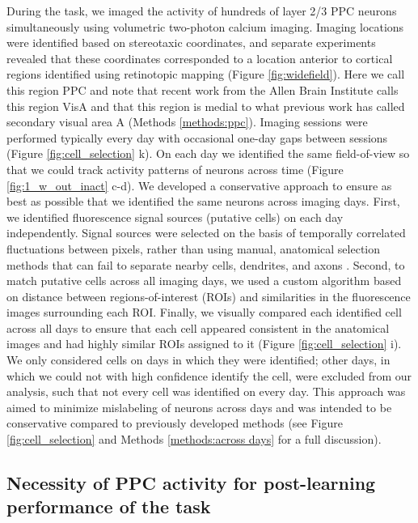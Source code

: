 During the task, we imaged the activity of hundreds of layer 2/3 PPC neurons simultaneously using volumetric two-photon calcium imaging. Imaging locations were identified based on stereotaxic coordinates, and separate experiments revealed that these coordinates corresponded to a location anterior to cortical regions identified using retinotopic mapping (Figure \ref{fig:widefield}). Here we call this region PPC and note that recent work from the Allen Brain Institute calls this region VisA  \citep{CCF2015} and that this region is medial to what previous work has called secondary visual area A \citep{Wang2007} (Methods \ref{methods:ppc}). Imaging sessions were performed typically every day with occasional one-day gaps between sessions (Figure \ref{fig:cell_selection} k). On each day we identified the same field-of-view so that we could track activity patterns of neurons across time (Figure \ref{fig:1_w_out_inact} c-d). We developed a conservative approach to ensure as best as possible that we identified the same neurons across imaging days. First, we identified fluorescence signal sources (putative cells) on each day independently. Signal sources were selected on the basis of temporally correlated fluctuations between pixels, rather than using manual, anatomical selection methods that can fail to separate nearby cells, dendrites, and axons \citep{Hamel2015, Peron2015}. Second, to match putative cells across all imaging days, we used a custom algorithm based on distance between regions-of-interest (ROIs) and similarities in the fluorescence images surrounding each ROI. Finally, we visually compared each identified cell across all days to ensure that each cell appeared consistent in the anatomical images and had highly similar ROIs assigned to it (Figure \ref{fig:cell_selection} i). We only considered cells on days in which they were identified; other days, in which we could not with high confidence identify the cell, were excluded from our analysis, such that not every cell was identified on every day. This approach was aimed to minimize mislabeling of neurons across days and was intended to be conservative compared to previously developed methods \citep{Huber2012, Liberti2016, Peron2015, Peters2014, Poort2015, Ziv2013} (see Figure \ref{fig:cell_selection} and Methods \ref{methods:across days} for a full discussion).  

\subsection{Necessity of PPC activity for post-learning performance of the task} \label{sec:chap3_necessity}

